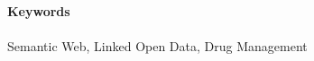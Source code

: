\documentclass[%
  parskip=half,
  ]{scrreprt} %
\title{%
\dipltitle\\%
\bigskip\usekomafont{subtitle}%
\parbox[h]{0.8\textwidth}{\begin{center}\diplsubtitle\end{center}}%
}
\subtitle{\usekomafont{subject}\vspace{3em}\diplsubject}
\author{}
\date{}
\newcommand{\rem}[1]{\textcolor{remcolor}{\emph{#1}}}
\begin{document}

\ifpdf
{}
\else
{}
\fi


\maketitle





\paragraph{Keywords} Semantic Web, Linked Open Data, Drug Management

\setcounter{tocdepth}{1}
\tableofcontents

\clearpage














\appendix



%


\listoffigures
\listoftables
\end{document}
